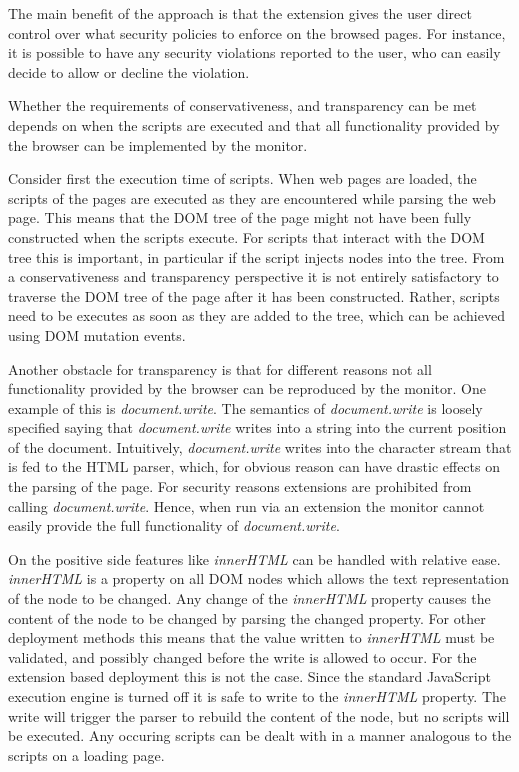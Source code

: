 \documentclass{llncs}
\begin{document}
The main benefit of the approach is that the extension gives the user direct
control over what security policies to enforce on the browsed pages. For
instance, it is possible to have any security violations reported to the user,
who can easily decide to allow or decline the violation. 

Whether the requirements of conservativeness, and transparency can be met
depends on when the scripts are executed and that all functionality provided by
the browser can be implemented by the monitor.

Consider first the execution time of scripts. When web pages are loaded, the
scripts of the pages are executed as they are encountered while parsing the web
page. This means that the DOM tree of the page might not have been fully
constructed when the scripts execute.  For scripts that interact with the DOM
tree this is important, in particular if the script injects nodes into the
tree. From a conservativeness and transparency perspective it is not entirely
satisfactory to traverse the DOM tree of the page after it has been
constructed.  Rather, scripts need to be executes as soon as they are added to
the tree, which can be achieved using DOM mutation events.

Another obstacle for transparency is that for different reasons not all
functionality provided by the browser can be reproduced by the monitor. One
example of this is \emph{document.write}. The semantics of
\emph{document.write} is loosely specified saying that \emph{document.write}
writes into a string into the current position of the document.  Intuitively,
\emph{document.write} writes into the character stream that is fed to the HTML
parser, which, for obvious reason can have drastic effects on the parsing of
the page. For security reasons extensions are prohibited from calling
\emph{document.write}. Hence, when run via an extension the monitor cannot
easily provide the full functionality of \emph{document.write}. 

On the positive side features like \emph{innerHTML} can be handled with
relative ease. \emph{innerHTML} is a property on all DOM nodes which allows the
text representation of the node to be changed. Any change of the
\emph{innerHTML} property causes the content of the node to be changed by
parsing the changed property. For other deployment methods this means that the
value written to \emph{innerHTML} must be validated, and possibly changed
before the write is allowed to occur.  For the extension based deployment this
is not the case.  Since the standard JavaScript execution engine is turned off
it is safe to write to the \emph{innerHTML} property. The write will trigger
the parser to rebuild the content of the node, but no scripts will be executed.
Any occuring scripts can be dealt with in a manner analogous to the scripts on
a loading page.
\end{document}
